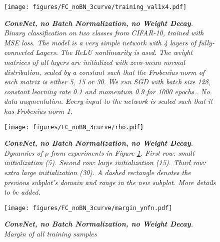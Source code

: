 \documentclass[11pt]{article}
\begin{document}
       

\begin{figure}
  \centering
  \texttt{[image: figures/FC\_noBN\_3curve/training\_val1x4.pdf]}   
  \caption {\it \textbf{ConvNet, no Batch Normalization, no Weight
      Decay}. Binary classification on two classes from CIFAR-10,
    trained with MSE loss. The model is a very simple network with 4
    layers of fully-connected Layers. The ReLU nonlinearity is used. The weight matrices of all layers are initialized with zero-mean normal distribution, scaled by a constant such that the Frobenius norm of each matrix is either 5, 15 or 30. We run SGD with batch size 128, constant learning rate 0.1 and momentum 0.9 for 1000 epochs..  No data augmentation.    Every input to the network is scaled such that it has Frobenius norm 1.  }             
  \label{fig:training_val}
\end{figure}


\begin{figure}
  \centering
  \texttt{[image: figures/FC\_noBN\_3curve/rho.pdf]}
  \caption {\it \textbf{ConvNet, no Batch Normalization, no Weight
      Decay}. Dynamics of $\rho$ from experiments in Figure \ref{fig:training_val}. First row: small initialization (5).  Second row: large initialization (15).  Third row: extra large initialization (30). A dashed rectangle denotes the previous subplot's domain and range in the new subplot.    More details to be added.  }      
  \label{fig:rho}
\end{figure}


\begin{figure}
  \centering
  \texttt{[image: figures/FC\_noBN\_3curve/margin\_ynfn.pdf]} 
  \caption {\it \textbf{ConvNet, no Batch Normalization, no Weight
      Decay}. Margin of all training samples}  \label{fig:margin}
\end{figure}
 
\end{document}
